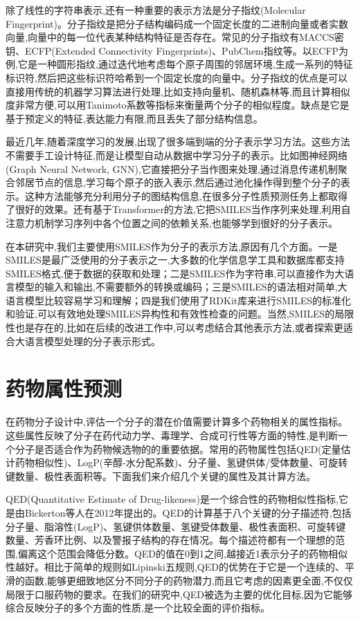 除了线性的字符串表示,还有一种重要的表示方法是分子指纹(Molecular Fingerprint)。分子指纹是把分子结构编码成一个固定长度的二进制向量或者实数向量,向量中的每一位代表某种结构特征是否存在。常见的分子指纹有MACCS密钥、ECFP(Extended Connectivity Fingerprints)、PubChem指纹等。以ECFP为例,它是一种圆形指纹,通过迭代地考虑每个原子周围的邻居环境,生成一系列的特征标识符,然后把这些标识符哈希到一个固定长度的向量中。分子指纹的优点是可以直接用传统的机器学习算法进行处理,比如支持向量机、随机森林等,而且计算相似度非常方便,可以用Tanimoto系数等指标来衡量两个分子的相似程度。缺点是它是基于预定义的特征,表达能力有限,而且丢失了部分结构信息。

最近几年,随着深度学习的发展,出现了很多端到端的分子表示学习方法。这些方法不需要手工设计特征,而是让模型自动从数据中学习分子的表示。比如图神经网络(Graph Neural Network, GNN),它直接把分子当作图来处理,通过消息传递机制聚合邻居节点的信息,学习每个原子的嵌入表示,然后通过池化操作得到整个分子的表示。这种方法能够充分利用分子的图结构信息,在很多分子性质预测任务上都取得了很好的效果。还有基于Transformer的方法,它把SMILES当作序列来处理,利用自注意力机制学习序列中各个位置之间的依赖关系,也能够学到很好的分子表示。

在本研究中,我们主要使用SMILES作为分子的表示方法,原因有几个方面。一是SMILES是最广泛使用的分子表示之一,大多数的化学信息学工具和数据库都支持SMILES格式,便于数据的获取和处理；二是SMILES作为字符串,可以直接作为大语言模型的输入和输出,不需要额外的转换或编码；三是SMILES的语法相对简单,大语言模型比较容易学习和理解；四是我们使用了RDKit库来进行SMILES的标准化和验证,可以有效地处理SMILES异构性和有效性检查的问题。当然,SMILES的局限性也是存在的,比如在后续的改进工作中,可以考虑结合其他表示方法,或者探索更适合大语言模型处理的分子表示形式。

\section{药物属性预测}

在药物分子设计中,评估一个分子的潜在价值需要计算多个药物相关的属性指标。这些属性反映了分子在药代动力学、毒理学、合成可行性等方面的特性,是判断一个分子是否适合作为药物候选物的的重要依据。常用的药物属性包括QED(定量估计药物相似性)、LogP(辛醇-水分配系数)、分子量、氢键供体/受体数量、可旋转键数量、极性表面积等。下面我们来介绍几个关键的属性及其计算方法。

QED(Quantitative Estimate of Drug-likeness)是一个综合性的药物相似性指标,它是由Bickerton等人在2012年提出的\cite{bickerton2012qed}。QED的计算基于八个关键的分子描述符,包括分子量、脂溶性(LogP)、氢键供体数量、氢键受体数量、极性表面积、可旋转键数量、芳香环比例、以及警报子结构的存在情况。每个描述符都有一个理想的范围,偏离这个范围会降低分数。QED的值在0到1之间,越接近1表示分子的药物相似性越好。相比于简单的规则如Lipinski五规则,QED的优势在于它是一个连续的、平滑的函数,能够更细致地区分不同分子的药物潜力,而且它考虑的因素更全面,不仅仅局限于口服药物的要求。在我们的研究中,QED被选为主要的优化目标,因为它能够综合反映分子的多个方面的性质,是一个比较全面的评价指标。

